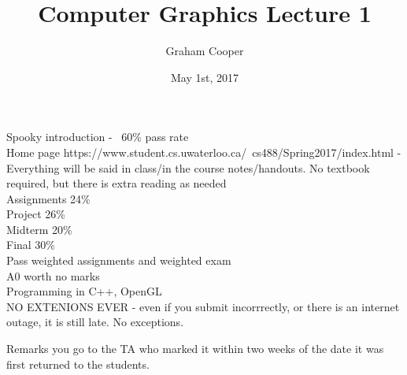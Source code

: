 \documentclass[12pt]{article}
\title{\vspace{-15ex}Computer Graphics Lecture 1\vspace{-1ex}}
\date{May 1st, 2017}
\author{Graham Cooper}
\begin{document}
	\maketitle
	
	Spooky introduction - ~60\% pass rate \\
	
	Home page https://www.student.cs.uwaterloo.ca/~cs488/Spring2017/index.html
	- Everything will be said in class/in the course notes/handouts. No textbook required, but there is extra reading as needed\\
	
	Assignments 24\%\\
	Project 26\%\\
	Midterm 20\%\\
	Final 30\%\\
	
	Pass weighted assignments and weighted exam\\
	
	A0 worth no marks\\
	
	Programming in C++, OpenGL\\
	NO EXTENIONS EVER - even if you submit incorrrectly, or there is an internet outage, it is still late. No exceptions.
	
	Remarks you go to the TA who marked it within two weeks of the date it was first returned to the students.\\
\end{document}
